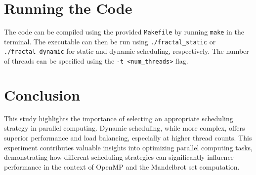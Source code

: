 \documentclass[11pt]{article}
\begin{document}
\hypertarget{running-the-code}{%
\section{Running the Code}\label{running-the-code}}

The code can be compiled using the provided \texttt{Makefile} by running
\texttt{make} in the terminal. The executable can then be run using
\texttt{./fractal\_static} or \texttt{./fractal\_dynamic} for static and
dynamic scheduling, respectively. The number of threads can be specified
using the \texttt{-t\ \textless{}num\_threads\textgreater{}} flag.

\hypertarget{conclusion}{%
\section{Conclusion}\label{conclusion}}

This study highlights the importance of selecting an appropriate
scheduling strategy in parallel computing. Dynamic scheduling, while
more complex, offers superior performance and load balancing, especially
at higher thread counts. This experiment contributes valuable insights
into optimizing parallel computing tasks, demonstrating how different
scheduling strategies can significantly influence performance in the
context of OpenMP and the Mandelbrot set computation.
\end{document}
